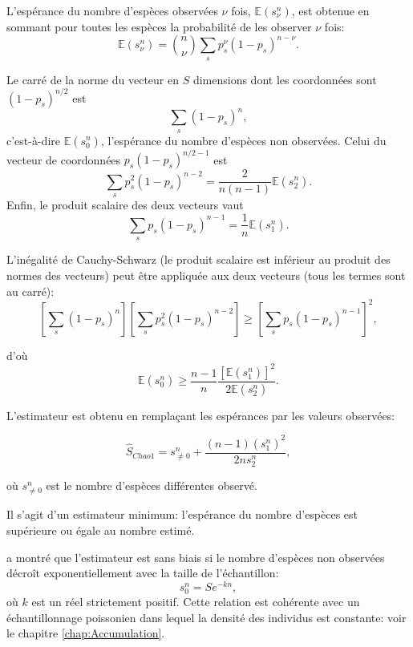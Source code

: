 \documentclass[
  11pt,
  french,
  a4paper,
  extrafontsizes,onecolumn,openright
  ]{memoir}
\begin{document}
L'espérance du nombre d'espèces observées \(\nu\) fois, \({\mathbb E}(s^{n}_{\nu})\), est obtenue en sommant pour toutes les espèces la probabilité de les observer \(\nu\) fois:
\begin{equation}
  \label{eq:Esnnu}
  {\mathbb E}\left( s^{n}_{\nu} \right) = \binom{n}{\nu} \sum_s{p_s^\nu \left( 1-p_s \right)^{n-\nu}}.
\end{equation}

Le carré de la norme du vecteur en \(S\) dimensions dont les coordonnées sont \((1-p_s)^{n/2}\) est
\[\sum_s{(1-p_s)^n},\]
c'est-à-dire \({\mathbb E}(s^{n}_{0})\), l'espérance du nombre d'espèces non observées.
Celui du vecteur de coordonnées \(p_s (1-p_s)^{n/2-1}\) est
\[\sum_s{p_s^2(1-p_s)^{n-2}}=\frac{2}{n(n-1)}{\mathbb E}(s^{n}_{2}).\]
Enfin, le produit scalaire des deux vecteurs vaut
\[\sum_s{p_s(1-p_s)^{n-1}}=\frac{1}{n}{\mathbb E}(s^{n}_{1}).\]

L'inégalité de Cauchy-Schwarz (le produit scalaire est inférieur au produit des normes des vecteurs) peut être appliquée aux deux vecteurs (tous les termes sont au carré):
\begin{equation}
  \label{eq:CauchySchwarz}
  \left[ \sum_s{(1-p_s)^n} \right] \left[ \sum_s{p_s^2(1-p_s)^{n-2}} \right] 
   \ge \left[ \sum_s{p_s(1-p_s)^{n-1}} \right]^2,
\end{equation}

d'où
\begin{equation}
  \label{eq:Esn0}
  {\mathbb E}(s^{n}_{0}) 
  \ge \frac{n-1}{n}\frac{\left[ {\mathbb E}(s^{n}_{1}) \right]^2}{2 {\mathbb E}(s^{n}_{2})}.
\end{equation}

L'estimateur est obtenu en remplaçant les espérances par les valeurs observées:

\begin{equation}
  \label{eq:Chao1}
  {\hat{S}}_\mathit{Chao1} 
   = s^{n}_{\ne 0} + \frac{\left(n-1 \right){\left(s^{n}_{1}\right)}^2}{2n{s^{n}_{2}}},
\end{equation}

où \(s^{n}_{\ne 0}\) est le nombre d'espèces différentes observé.

Il s'agit d'un estimateur minimum: l'espérance du nombre d'espèces est supérieure ou égale au nombre estimé.

\textcite{Beguinot2014} a montré que l'estimateur est sans biais si le nombre d'espèces non observées décroît exponentiellement avec la taille de l'échantillon:
\begin{equation}
  \label{eq:BiaisChao}
  s^{n}_{0} = S e^{-kn},
\end{equation}
où \(k\) est un réel strictement positif.
Cette relation est cohérente avec un échantillonnage poissonien dans lequel la densité des individus est constante: voir le chapitre \ref{chap:Accumulation}.
\end{document}
